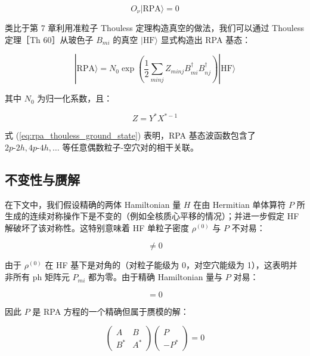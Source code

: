 \begin{equation}
O_{\nu}|\text{RPA}\rangle=0\label{eq:rpa_boson_vacuum_condition}
\end{equation}

类比于第 7 章利用准粒子 Thouless 定理构造真空的做法，我们可以通过 Thouless 定理［Th 60］从玻色子 $B_{mi}$
的真空 $|\text{HF}\rangle$ 显式构造出 RPA 基态：

\begin{equation}
|\text{RPA}\rangle=N_{0}\exp\left(\frac{1}{2}\sum_{minj}Z_{minj}B^{\dagger}_{mi}B^{\dagger}_{nj}\right)|\text{HF}\rangle\label{eq:rpa_thouless_ground_state}
\end{equation}

其中 $N_{0}$ 为归一化系数，且：

\begin{equation}
Z=Y^{*}X^{*-1}\label{eq:rpa_thouless_z_matrix}
\end{equation}

式 (\ref{eq:rpa_thouless_ground_state}) 表明，RPA 基态波函数包含了 $2p\text{-}2h,4p\text{-}4h,\dots$
等任意偶数粒子-空穴对的相干关联。

\subsection{不变性与赝解\label{subsec:8.4.7_=004E0D=0053D8=006027=004E0E=008D5D=0089E3}}

在下文中，我们假设精确的两体 Hamiltonian 量 $H$ 在由 Hermitian 单体算符 $P$ 所生成的连续对称操作下是不变的（例如全核质心平移的情况）；并进一步假定
HF 解破坏了该对称性。这特别意味着 HF 单粒子密度 $\rho^{(0)}$ 与 $P$ 不对易：

\begin{equation}
[\rho^{(0)},P]\ne0\label{eq:rpa_broken_symmetry_condition}
\end{equation}

由于 $\rho^{(0)}$ 在 HF 基下是对角的（对粒子能级为 0，对空穴能级为 1），这表明并非所有 ph 矩阵元 $P_{mi}$
都为零。由于精确 Hamiltonian 量与 $P$ 对易：

\begin{equation}
[H,P]=0\label{eq:rpa_exact_commutation_hp}
\end{equation}

因此 $P$ 是 RPA 方程的一个精确但属于赝模的解：

\begin{equation}
\begin{pmatrix}A & B\\
B^{*} & A^{*}
\end{pmatrix}\begin{pmatrix}P\\
-P^{*}
\end{pmatrix}=0\label{eq:rpa_spurious_zero_mode}
\end{equation}

